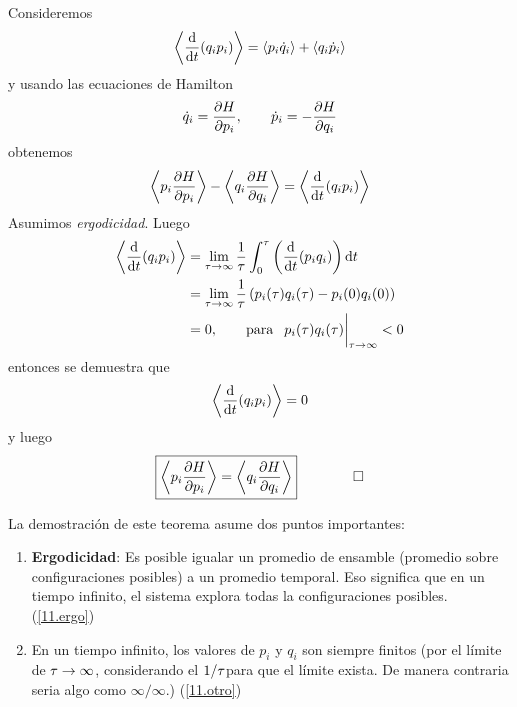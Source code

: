 \begin{dem}
	Consideremos
	\begin{equation}
  \ev{\dv{t}(q_ip_i)}=\ev{p_i\dot{q}_i}+\ev{q_i\dot{p}_i}
\end{equation}
y usando las ecuaciones de Hamilton
\begin{equation}
  \dot{q}_i=\pdv{H}{p_i},\qquad \dot{p}_i=-\pdv{H}{q_i}
\end{equation}
obtenemos
\begin{equation}
  \ev{p_i\pdv{H}{p_i}}-\ev{q_i\pdv{H}{q_i}}=\ev{\dv{t}(q_ip_i)}
\end{equation}
Asumimos \textit{ergodicidad}. Luego
\begin{align}
  \ev{\dv{t}(q_ip_i)}&=\lim_{\t\to\infty}\frac{1}{\t }\int_0^\t \left(\dv{t}(p_iq_i)\right)\dd t\label{11.ergo}\\
  &=\lim_{\t\to\infty}\frac{1}{\t }\left(p_i(\t)q_i(\t)-p_i(0)q_i(0)\right)\\
  &=0,\qquad \text{para }\,  \eval{p_i(\t)q_i(\t)}_{\t\to\infty}<0\label{11.otro}
\end{align}
entonces se demuestra que
\begin{equation}
  \ev{\dv{t}(q_ip_i)}=0
\end{equation}
y luego
\begin{equation}
\boxed{  \ev{p_i\pdv{H}{p_i}}=\ev{q_i\pdv{H}{q_i}}}\qquad \qed
\end{equation}
\end{dem}

La demostración de este teorema asume dos puntos importantes:
\begin{enumerate}
	\item \textbf{Ergodicidad}: Es posible igualar un promedio de ensamble (promedio sobre configuraciones posibles) a un promedio temporal. Eso significa que en un tiempo infinito, el sistema explora todas la configuraciones posibles. (\eqref{11.ergo})
	\item En un tiempo infinito, los valores de $p_i$ y $q_i$ son siempre finitos (por el límite de $\tau\to\infty$, considerando el $1/\tau $para que el límite exista. De manera contraria seria algo como $\infty/\infty$.) (\eqref{11.otro})
\end{enumerate}

















